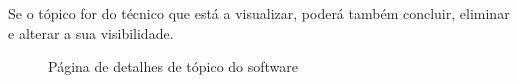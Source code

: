 Se o tópico for do técnico que está a visualizar, poderá também concluir, eliminar e alterar a sua visibilidade.

\begin{figure}[htb]%
    \centering
    \qquad
    \caption{Página de detalhes de tópico do software}%
    \label{fig:27}%
\end{figure}

